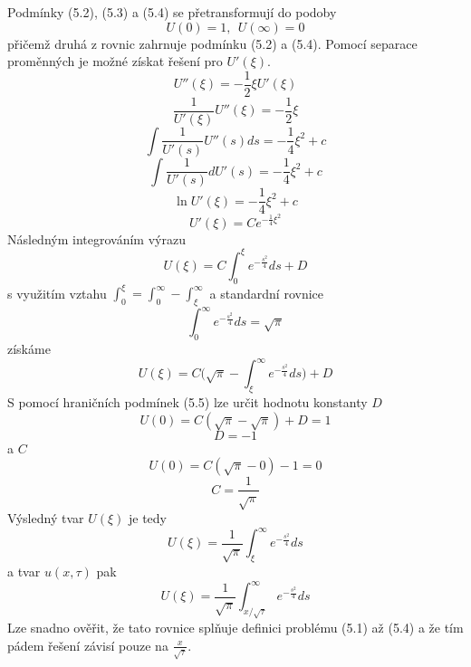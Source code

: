 \documentclass[a4paper]{book}
\begin{document}
Podmínky (5.2), (5.3) a (5.4) se přetransformují do podoby
\begin{equation}
U(0) = 1, ~~ U(\infty) = 0
\end{equation}
přičemž druhá z rovnic zahrnuje podmínku (5.2) a (5.4). Pomocí separace proměnných je možné získat řešení pro $U'(\xi)$.
\begin{equation*}
U''(\xi) = -\frac{1}{2}\xi U'(\xi)
\end{equation*}
\begin{equation*}
\frac{1}{U'(\xi)} U''(\xi)= -\frac{1}{2}\xi
\end{equation*}
\begin{equation*}
\int \frac{1}{U'(s)} U''(s) ds = -\frac{1}{4}\xi^2 + c
\end{equation*}
\begin{equation*}
\int \frac{1}{U'(s)} d U'(s) = -\frac{1}{4}\xi^2 + c
\end{equation*}
\begin{equation*}
\ln U'(\xi) = -\frac{1}{4}\xi^2 + c
\end{equation*}
\begin{equation*}
U'(\xi) = Ce^{-\frac{1}{4}\xi^2}
\end{equation*}
Následným integrováním výrazu
\begin{equation*}
U(\xi) = C \int^{\xi}_0 e^{-\frac{s^2}{4}}ds + D
\end{equation*}
s využitím vztahu $\int^{\xi}_0 = \int^{\infty}_0 - \int^{\infty}_{\xi}$ a standardní rovnice
\begin{equation*}
\int^{\infty}_0 e^{-\frac{s^2}{4}}ds = \sqrt{\pi}
\end{equation*}
získáme
\begin{equation*}
U(\xi) = C \bigg(\sqrt{\pi}  - \int^{\infty}_{\xi} e^{-\frac{s^2}{4}}ds \bigg) + D
\end{equation*}
S pomocí hraničních podmínek (5.5) lze určit hodnotu konstanty $D$
\begin{equation*}
U(0) = C(\sqrt{\pi} - \sqrt{\pi}) + D = 1
\end{equation*}
\begin{equation*}
D = -1
\end{equation*}
a $C$
\begin{equation*}
U(0) = C(\sqrt{\pi} - 0) - 1 = 0
\end{equation*}
\begin{equation*}
C = \frac{1}{\sqrt{\pi}}
\end{equation*}
Výsledný tvar $U(\xi)$ je tedy
\begin{equation*}
U(\xi) = \frac{1}{\sqrt{\pi}} \int^{\infty}_{\xi} e^{-\frac{s^2}{4}}ds
\end{equation*}
a tvar $u(x,\tau)$ pak
\begin{equation*}
U(\xi) = \frac{1}{\sqrt{\pi}} \int^{\infty}_{x /\sqrt{\tau}} e^{-\frac{s^2}{4}}ds
\end{equation*}
Lze snadno ověřit, že tato rovnice splňuje definici problému (5.1) až (5.4) a že tím pádem řešení závisí pouze na $\frac{x}{\sqrt{\tau}}$.\\
\end{document}
